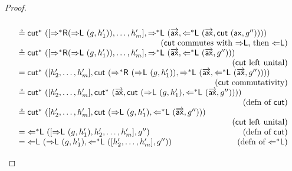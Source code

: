 \documentclass[a4paper,UKenglish,cleveref,autoref,thm-restate, anonymous]{lipics-v2021}
\renewcommand{\vec}[1]{\overrightarrow{#1}}
\newcommand{\Larr}{\Leftarrow}
\newcommand{\Ls}{\Leftarrow^*}
\newcommand{\Rarr}{\Rightarrow}
\newcommand{\Rs}{\Rightarrow^*}
\newcommand{\mf}[1]{\mathsf{#1}}
\newcommand{\ax}{\mathsf{ax}}
\newcommand{\Ll}{{\Larr}\mathsf{L}}
\newcommand{\Lsl}{{\Ls}\mathsf{L}}
\newcommand{\Rl}{{\Rarr}\mathsf{L}}
\newcommand{\Rsl}{{\Rs}\mathsf{L}}
\newcommand{\Rsr}{{\Rs}\mathsf{R}}
\newcommand{\cut}{\mf{cut}}
\newcommand{\cuts}{\mf{cut}^*}
\begin{document}
\begin{proof}
\[\begin{array}{lr}
    \\
    \circeq \cuts \ ([\Rsr (\Rl \ (g, h'_1)), \dots, h'_m],\Rsl\ (\vec{\ax}, \Lsl \ (\vec{\ax}, \cut\ (\ax,g''))))
    \\
    &\hspace*{-5cm}\text{($\cut$ commutes with $\Rl$, then $\Ll$)}
  \\
    \circeq \cuts \ ([\Rsr (\Rl \ (g, h'_1)), \dots, h'_m],\Rsl\ (\vec{\ax}, \Lsl \ (\vec{\ax}, g'')))
    \\
    &\hspace*{-3.5cm} \text{($\cut$ left unital)}
    \\
    = \cuts\ ([h'_2,\dots,h'_m], \cut \ (\Rsr \ (\Rl \ (g,h'_1)), \Rsl \ (\vec{\ax}, \Lsl \ (\vec{\ax}, g''))))
    &
    \\
    &\hspace*{-3.5cm}\text{($\cut$ commutativity)}
    \\
    \circeq \cuts\ ([h'_2,\dots,h'_m],\cuts\ (\vec{\ax},\cut\ (\Rl \ (g, h'_1), \Lsl \ (\vec{\ax}, g''))))
    \\
    &\hspace*{-3.5cm}\text{(defn of $\cut$)}
    \\
    \circeq \cuts\ ([h'_2,\dots,h'_m],\cut\ (\Rl \ (g, h'_1), \Lsl \ (\vec{\ax}, g'')))
    \\
    &\hspace*{-3.5cm}\text{($\cut$ left unital)}
    \\
    = \Lsl \ ([\Rl \ (g, h'_1), h'_2,\dots,h'_m], g'') 
    &\hspace*{-3.5cm}\text{(defn of $\cut$)}
    \\
    = \Ll \ (\Rl \ (g,h'_1) , \Lsl \ ([h'_2,\dots,h'_m],g''))
    &\hspace*{-3.5cm}\text{(defn of $\Lsl$)}
    \end{array}
  \]
  \[
  \begin{array}{lr}

\end{array}\]
\end{proof}
\end{document}

